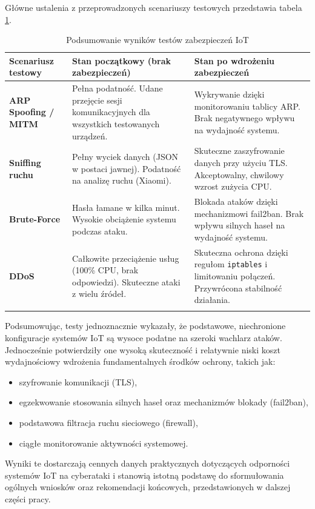 Główne ustalenia z przeprowadzonych scenariuszy testowych przedstawia tabela \ref{tab:podsumowanie-testow}.
\begin{table}[htbp]
\centering
\caption{Podsumowanie wyników testów zabezpieczeń IoT}
\begin{tabular}{p{4.5cm} p{5cm} p{5cm}}
\toprule
\textbf{Scenariusz testowy} & \textbf{Stan początkowy (brak zabezpieczeń)} & \textbf{Stan po wdrożeniu zabezpieczeń} \\
\midrule
\textbf{ARP Spoofing / MITM} & Pełna podatność. Udane przejęcie sesji komunikacyjnych dla wszystkich testowanych urządzeń. & Wykrywanie dzięki monitorowaniu tablicy ARP. Brak negatywnego wpływu na wydajność systemu. \\
\midrule
\textbf{Sniffing ruchu} & Pełny wyciek danych (JSON w postaci jawnej). Podatność na analizę ruchu (Xiaomi). & Skuteczne zaszyfrowanie danych przy użyciu TLS. Akceptowalny, chwilowy wzrost zużycia CPU. \\
\midrule
\textbf{Brute-Force} & Hasła łamane w kilka minut. Wysokie obciążenie systemu podczas ataku. & Blokada ataków dzięki mechanizmowi fail2ban. Brak wpływu silnych haseł na wydajność systemu. \\
\midrule
\textbf{DDoS} & Całkowite przeciążenie usług (100\% CPU, brak odpowiedzi). Skuteczne ataki z wielu źródeł. & Skuteczna ochrona dzięki regułom \texttt{iptables} i limitowaniu połączeń. Przywrócona stabilność działania. \\
\bottomrule
\label{tab:podsumowanie-testow}
\end{tabular}
\end{table}

Podsumowując, testy jednoznacznie wykazały, że podstawowe, niechronione konfiguracje systemów IoT są wysoce podatne na szeroki wachlarz ataków. Jednocześnie potwierdziły one wysoką skuteczność i relatywnie niski koszt wydajnościowy wdrożenia fundamentalnych środków ochrony, takich jak:
\begin{itemize}
    \item szyfrowanie komunikacji (TLS),
    \item egzekwowanie stosowania silnych haseł oraz mechanizmów blokady (fail2ban),
    \item podstawowa filtracja ruchu sieciowego (firewall),
    \item ciągłe monitorowanie aktywności systemowej.
\end{itemize}

Wyniki te dostarczają cennych danych praktycznych dotyczących odporności systemów IoT na cyberataki i stanowią istotną podstawę do sformułowania ogólnych wniosków oraz rekomendacji końcowych, przedstawionych w dalszej części pracy.
